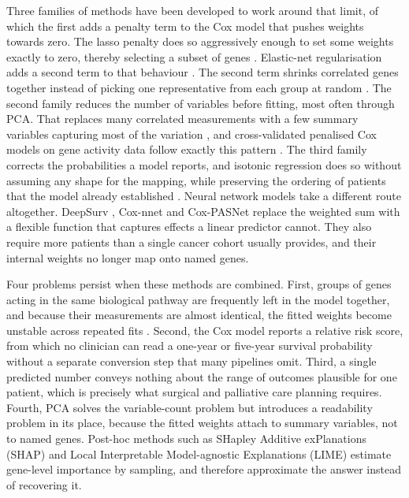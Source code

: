 \documentclass[10pt,a4paper]{article}
\begin{document}
Three families of methods have been developed to work around that limit, of which
the first adds a penalty term to the Cox model that pushes weights towards zero.
The lasso penalty does so aggressively enough to set some weights exactly to zero,
thereby selecting a subset of genes \citep{tibshirani1997lasso}. Elastic-net
regularisation adds a second term to that behaviour \citep{zou2005regularization,
wu2012elastic}. The second term shrinks correlated genes together instead of picking
one representative from each group at random \citep{simon2011regularization,
hastie2009elements}. The second family
reduces the number of variables before fitting, most often through PCA. That
replaces many correlated measurements with a few summary variables capturing most
of the variation \citep{hotelling1933analysis, jolliffe2016principal}, and
cross-validated penalised Cox models on gene activity data follow exactly this
pattern \citep{vanhouwelingen2006crossvalidated}. The third family corrects the
probabilities a model reports, and isotonic regression does so without assuming any
shape for the mapping, while preserving the ordering of patients that the model
already established \citep{ayer1955empirical, zadrozny2002transforming}. Neural
network models take a different route altogether. DeepSurv
\citep{katzman2018deepsurv}, Cox-nnet \citep{ching2018coxnnet} and Cox-PASNet
\citep{hao2019coxpasnet} replace the weighted sum with a flexible function that
captures effects a linear predictor cannot. They also require more patients than a
single cancer cohort usually provides, and their internal weights no longer map onto
named genes.

Four problems persist when these methods are combined. First, groups of genes
acting in the same biological pathway are frequently left in the model together,
and because their measurements are almost identical, the fitted weights become
unstable across repeated fits \citep{simon2011regularization}. Second, the Cox
model reports a relative risk score, from which no clinician can read a one-year or
five-year survival probability without a separate conversion step that many
pipelines omit. Third, a single predicted number conveys nothing about the range of
outcomes plausible for one patient, which is precisely what surgical and palliative
care planning requires. Fourth, PCA solves the variable-count problem but
introduces a readability problem in its place, because the fitted weights attach to
summary variables, not to named genes. Post-hoc methods such as SHapley Additive
exPlanations (SHAP) \citep{lundberg2017unified} and Local Interpretable
Model-agnostic Explanations (LIME) \citep{ribeiro2016why} estimate gene-level
importance by sampling, and therefore approximate the answer instead of recovering
it.
\end{document}
